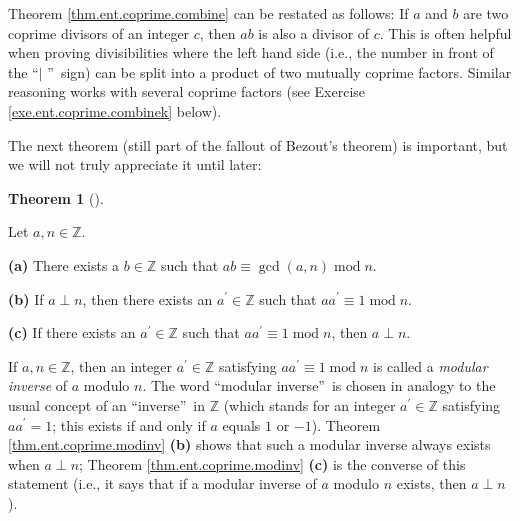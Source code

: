 \documentclass[numbers=enddot,12pt,final,onecolumn,notitlepage]{scrartcl}%
\numberwithin{exer}{subsection}
\theoremstyle{definition}
\newtheorem{theo}{Theorem}[subsection]
\newenvironment{theorem}[1][]
{\begin{theo}[#1]\begin{leftbar}}
{\end{leftbar}\end{theo}}
\begin{document}
Theorem \ref{thm.ent.coprime.combine} can be restated as follows: If $a$ and
$b$ are two coprime divisors of an integer $c$, then $ab$ is also a divisor of
$c$. This is often helpful when proving divisibilities where the left hand
side (i.e., the number in front of the \textquotedblleft$\mid$%
\textquotedblright\ sign) can be split into a product of two mutually coprime
factors. Similar reasoning works with several coprime factors (see Exercise
\ref{exe.ent.coprime.combinek} below).

The next theorem (still part of the fallout of Bezout's theorem) is important,
but we will not truly appreciate it until later:

\begin{theorem}
\label{thm.ent.coprime.modinv}Let $a,n\in\mathbb{Z}$.

\textbf{(a)} There exists a $b\in\mathbb{Z}$ such that $ab\equiv\gcd\left(
a,n\right)  \operatorname{mod}n$.

\textbf{(b)} If $a\perp n$, then there exists an $a^{\prime}\in\mathbb{Z}$
such that $aa^{\prime}\equiv1\operatorname{mod}n$.

\textbf{(c)} If there exists an $a^{\prime}\in\mathbb{Z}$ such that
$aa^{\prime}\equiv1\operatorname{mod}n$, then $a\perp n$.
\end{theorem}

If $a,n\in\mathbb{Z}$, then an integer $a^{\prime}\in\mathbb{Z}$ satisfying
$aa^{\prime}\equiv1\operatorname{mod}n$ is called a \textit{modular inverse}
of $a$ modulo $n$. The word \textquotedblleft modular
inverse\textquotedblright\ is chosen in analogy to the usual concept of an
\textquotedblleft inverse\textquotedblright\ in $\mathbb{Z}$ (which stands for
an integer $a^{\prime}\in\mathbb{Z}$ satisfying $aa^{\prime}=1$; this exists
if and only if $a$ equals $1$ or $-1$). Theorem \ref{thm.ent.coprime.modinv}
\textbf{(b)} shows that such a modular inverse always exists when $a\perp n$;
Theorem \ref{thm.ent.coprime.modinv} \textbf{(c)} is the converse of this
statement (i.e., it says that if a modular inverse of $a$ modulo $n$ exists,
then $a\perp n$).
\end{document}
